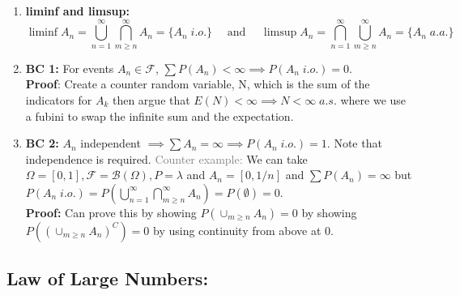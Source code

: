 \documentclass{article}
\begin{document}
\begin{enumerate}
    \item \textbf{liminf and limsup:}
    \[
    \liminf A_n = \bigcup_{n = 1}^{\infty} \bigcap_{m\geq n}^\infty A_n = \{A_n \; i.o.\} \quad \text{ and } \quad \limsup A_n  = \bigcap_{n = 1}^{\infty} \bigcup_{m\geq n}^\infty A_n = \{A_n \; a.a.\}
    \]
    \item \textbf{BC 1:} For events \(A_n \in \mathcal{F}\), \(\sum P(A_n) < \infty \implies P(A_n \; i.o.) = 0\).\\

    \textbf{Proof}: Create a counter random variable, N, which is the sum of the indicators for \(A_k\) then argue that \(E(N)<\infty\implies N<\infty \;a.s.\) where we use a fubini to swap the infinite sum and the expectation.

    \item \textbf{BC 2:} \(A_n\) independent \(\implies \sum A_n = \infty \implies P(A_n \; i.o.) = 1\). Note that independence is required. \textcolor{gray}{Counter example:} We can take \(\Omega = [0,1], \mathcal{F} = \mathcal{B}(\Omega), P = \lambda\) and \(A_n = [0,1/n]\) and \(\sum P(A_n) = \infty\) but \(P(A_n \; i.o.) = P(\bigcup_{n = 1}^{\infty} \bigcap_{m\geq n}^\infty A_n) = P(\emptyset) = 0.\)\\
    
    \textbf{Proof:} Can prove this by showing \(P(\cup_{m\geq n}A_n) = 0\) by showing \(P((\cup_{m\geq n}A_n)^C)=0\) by using continuity from above at 0.
\end{enumerate}

\subsection*{Law of Large Numbers:}
\end{document}
